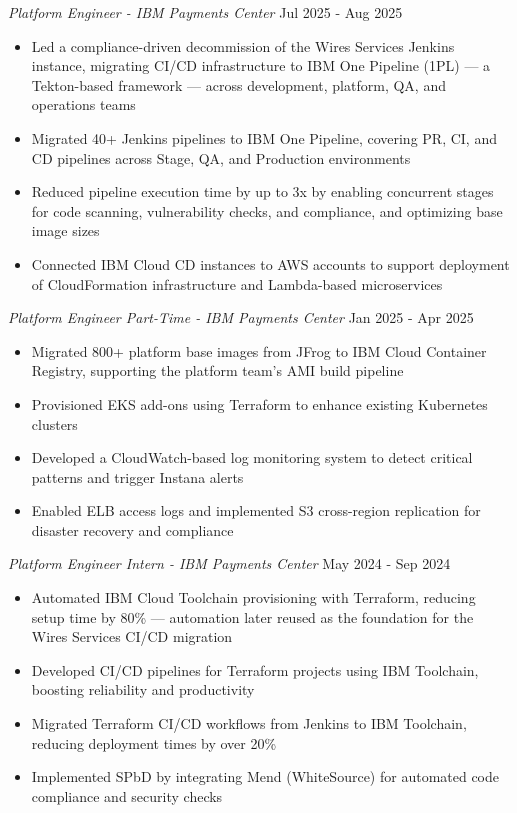 \textit{Platform Engineer - IBM Payments Center} \hfill Jul 2025 - Aug 2025
\begin{itemize}
  \item Led a compliance-driven decommission of the Wires Services Jenkins instance, migrating CI/CD infrastructure to IBM One Pipeline (1PL) — a Tekton-based framework — across development, platform, QA, and operations teams
  \item Migrated 40+ Jenkins pipelines to IBM One Pipeline, covering PR, CI, and CD pipelines across Stage, QA, and Production environments
  \item Reduced pipeline execution time by up to 3x by enabling concurrent stages for code scanning, vulnerability checks, and compliance, and optimizing base image sizes
  \item Connected IBM Cloud CD instances to AWS accounts to support deployment of CloudFormation infrastructure and Lambda-based microservices
\end{itemize}
\vspace{0.1cm} \par

\textit{Platform Engineer Part-Time - IBM Payments Center} \hfill Jan 2025 - Apr 2025

\begin{itemize}
  \item Migrated 800+ platform base images from JFrog to IBM Cloud Container Registry, supporting the platform team's AMI build pipeline
  \item Provisioned EKS add-ons using Terraform to enhance existing Kubernetes clusters
  \item Developed a CloudWatch-based log monitoring system to detect critical patterns and trigger Instana alerts
  \item Enabled ELB access logs and implemented S3 cross-region replication for disaster recovery and compliance
\end{itemize}
\vspace{0.1cm} \par

\textit{Platform Engineer Intern - IBM Payments Center} \hfill May 2024 - Sep 2024

\begin{itemize}
  \item Automated IBM Cloud Toolchain provisioning with Terraform, reducing setup time by 80\% — automation later reused as the foundation for the Wires Services CI/CD migration
  \item Developed CI/CD pipelines for Terraform projects using IBM Toolchain, boosting reliability and productivity
  \item Migrated Terraform CI/CD workflows from Jenkins to IBM Toolchain, reducing deployment times by over 20\%
  \item Implemented SPbD by integrating Mend (WhiteSource) for automated code compliance and security checks
\end{itemize}
\vspace{0.2cm} \par
